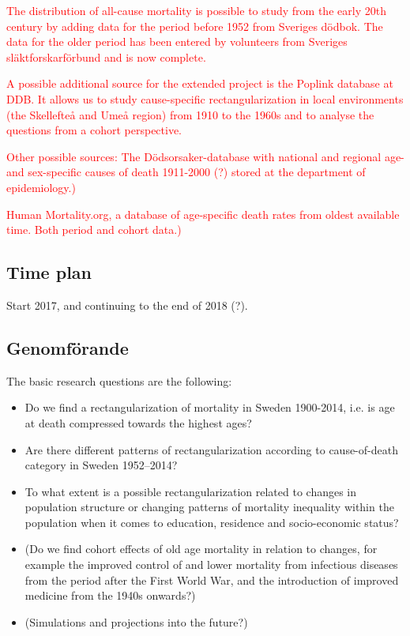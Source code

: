 \documentclass[a4paper,12pt]{article}
\begin{document}
\textcolor{red}{The distribution of all-cause mortality is possible to study from the early
20th century by adding data for the period before 1952 from Sveriges
dödbok. The data for the older period has been entered by volunteers from
Sveriges släktforskarförbund and is now complete.} 

\textcolor{red}{A possible additional source for the extended project is the Poplink
database at DDB. It allows us to study cause-specific rectangularization in
local environments (the Skellefteå and Umeå region) from 1910 to the 1960s
and to analyse the questions from a cohort perspective.
}

\textcolor{red}{Other possible sources: The Dödsorsaker-database with national and regional
age- and sex-specific causes of death 1911-2000 (?) stored at the
department of epidemiology.)}

\textcolor{red}{Human Mortality.org, a database of age-specific death rates from oldest
available time. Both period and cohort data.)}


\subsection{Time plan}

Start 2017, and continuing to the end of 2018 (?).

\subsection{Genomförande}

The basic research questions are the following:

\begin{itemize}

\item[] Do we find a rectangularization of mortality in Sweden 1900-2014,
  i.e. is age at death compressed towards the highest ages?

\item[] Are there different patterns of rectangularization according to
  cause-of-death category in Sweden 1952--2014?

\item[] To what extent is a possible rectangularization related to changes
in population structure or changing patterns of mortality inequality within
the population when it comes to education, residence and socio-economic
status?  

\item[] (Do we find cohort effects of old age mortality in relation to
  changes, for example the improved control of and lower mortality from
  infectious diseases from the period after the First World War, and the
  introduction of improved medicine from the 1940s onwards?) 

\item[] (Simulations and projections into the future?) 

\end{itemize}
\end{document}
